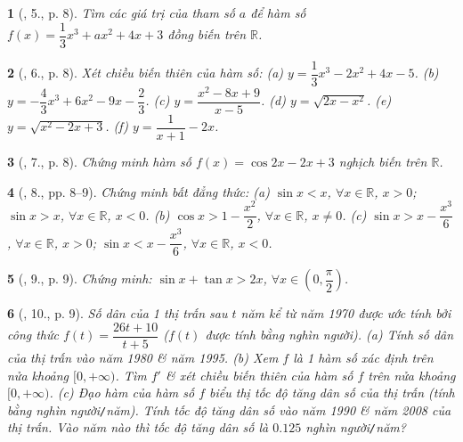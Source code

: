 \documentclass{article}
\newtheorem{baitoan}{}
\begin{document}
\begin{baitoan}[\cite{SGK_Toan_12_giai_tich_nang_cao}, 5., p. 8]
	Tìm các giá trị của tham số $a$ để hàm số $f(x) = \dfrac{1}{3}x^3 + ax^2 + 4x + 3$ đồng biến trên $\mathbb{R}$.
\end{baitoan}

\begin{baitoan}[\cite{SGK_Toan_12_giai_tich_nang_cao}, 6., p. 8]
	Xét chiều biến thiên của hàm số: (a) $y = \dfrac{1}{3}x^3 - 2x^2 + 4x - 5$. (b) $y = -\dfrac{4}{3}x^3 + 6x^2 - 9x - \dfrac{2}{3}$. (c) $y = \dfrac{x^2 - 8x + 9}{x - 5}$. (d) $y = \sqrt{2x - x^2}$. (e) $y = \sqrt{x^2 - 2x + 3}$. (f) $y = \dfrac{1}{x + 1} - 2x$.
\end{baitoan}

\begin{baitoan}[\cite{SGK_Toan_12_giai_tich_nang_cao}, 7., p. 8]
	Chứng minh hàm số $f(x) = \cos2x - 2x + 3$ nghịch biến trên $\mathbb{R}$.
\end{baitoan}

\begin{baitoan}[\cite{SGK_Toan_12_giai_tich_nang_cao}, 8., pp. 8--9]
	Chứng minh bất đẳng thức: (a) $\sin x < x$, $\forall x\in\mathbb{R}$, $x > 0$; $\sin x > x$, $\forall x\in\mathbb{R}$, $x < 0$. (b) $\cos x > 1 - \dfrac{x^2}{2}$, $\forall x\in\mathbb{R}$, $x\ne0$. (c) $\sin x > x - \dfrac{x^3}{6}$, $\forall x\in\mathbb{R}$, $x > 0$; $\sin x < x - \dfrac{x^3}{6}$, $\forall x\in\mathbb{R}$, $x < 0$.
\end{baitoan}

\begin{baitoan}[\cite{SGK_Toan_12_giai_tich_nang_cao}, 9., p. 9]
	Chứng minh: $\sin x + \tan x > 2x$, $\forall x\in\left(0,\dfrac{\pi}{2}\right)$.
\end{baitoan}

\begin{baitoan}[\cite{SGK_Toan_12_giai_tich_nang_cao}, 10., p. 9]
	Số dân của 1 thị trấn sau $t$ năm kể từ năm 1970 được ước tính bởi công thức $f(t) = \dfrac{26t + 10}{t + 5}$ ($f(t)$ được tính bằng nghìn người). (a) Tính số dân của thị trấn vào năm 1980 \& năm 1995. (b) Xem $f$ là 1 hàm số xác định trên nửa khoảng $[0,+\infty)$. Tìm $f'$ \& xét chiều biến thiên của hàm số $f$ trên nửa khoảng $[0,+\infty)$. (c) Đạo hàm của hàm số $f$ biểu thị tốc độ tăng dân số của thị trấn (tính bằng nghìn người{\tt/}năm). Tính tốc độ tăng dân số vào năm 1990 \& năm 2008 của thị trấn. Vào năm nào thì tốc độ tăng dân số là $0.125$ nghìn người{\tt/}năm?
\end{baitoan}
\end{document}
